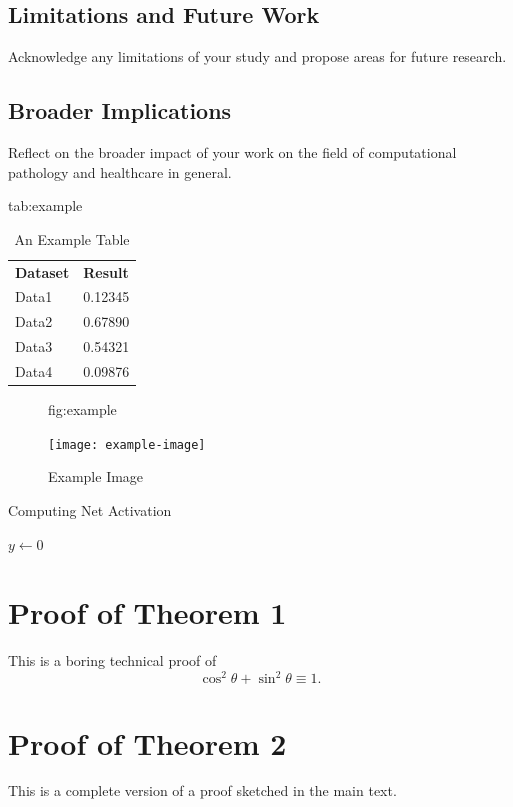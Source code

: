 \documentclass[anon]{midl} %
\begin{document}
\subsection{Limitations and Future Work}
Acknowledge any limitations of your study and propose areas for future research.

\subsection{Broader Implications}
Reflect on the broader impact of your work on the field of computational pathology and healthcare in general.





\begin{table}[htbp]
\floatconts
  {tab:example}%
  {\caption{An Example Table}}%
  {\begin{tabular}{ll}
  \bfseries Dataset & \bfseries Result\\
  Data1 & 0.12345\\
  Data2 & 0.67890\\
  Data3 & 0.54321\\
  Data4 & 0.09876
  \end{tabular}}
\end{table}

\begin{figure}[htbp]
\floatconts
  {fig:example}
  {\caption{Example Image}}
  {\texttt{[image: example-image]}}
\end{figure}

\begin{algorithm2e}
\caption{Computing Net Activation}
\label{alg:net}
{}
$y\leftarrow 0$\;
\end{algorithm2e}








\appendix

\section{Proof of Theorem 1}

This is a boring technical proof of
\begin{equation}\label{eq:example}
\cos^2\theta + \sin^2\theta \equiv 1.
\end{equation}

\section{Proof of Theorem 2}

This is a complete version of a proof sketched in the main text.
\end{document}
